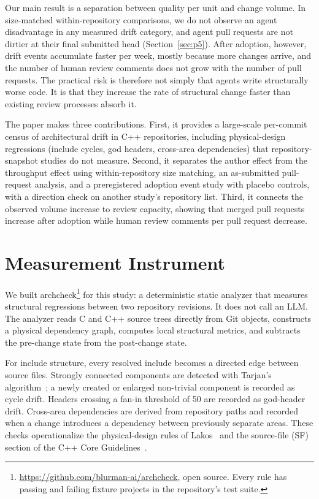 \documentclass[sigplan,11pt,nonacm=true]{acmart}
\newcommand{\tool}{archcheck}
\begin{document}
Our main result is a separation between quality per unit and change volume. In
size-matched within-repository comparisons, we do not observe an agent
disadvantage in any measured drift category, and agent pull requests are not
dirtier at their final submitted head (Section~\ref{sec:p5}). After adoption, however, drift events accumulate
faster per week, mostly because more changes arrive, and the number of human review
comments does not grow with the number of pull requests. The practical risk is therefore not simply that agents write
structurally worse code. It is that they increase the rate of structural
change faster than existing review processes absorb it.

The paper makes three contributions. First, it provides a large-scale
per-commit census of architectural drift in C++ repositories, including
physical-design regressions (include cycles, god headers, cross-area
dependencies) that repository-snapshot studies do not measure. Second, it
separates the author effect from the throughput effect using within-repository
size matching, an as-submitted pull-request analysis, and a preregistered
adoption event study with placebo controls, with a direction check on another
study's repository list. Third, it connects the
observed volume increase to review capacity, showing that merged pull requests
increase after adoption while human review comments per pull request decrease.

\section{Measurement Instrument}
\label{sec:instrument}

We built \tool{}\footnote{\url{https://github.com/blurman-ai/archcheck}, open
source. Every rule has passing and failing fixture projects in the repository's
test suite.} for this study: a deterministic static analyzer that measures
structural regressions between two repository revisions. It does not call an
LLM. The analyzer reads C and C++ source trees directly from Git objects,
constructs a physical dependency graph, computes local structural metrics, and
subtracts the pre-change state from the post-change state.

For include structure, every resolved include becomes a directed edge between
source files. Strongly connected components are detected with Tarjan's
algorithm~\cite{tarjan1972}; a newly created or enlarged non-trivial component
is recorded as cycle drift. Headers crossing a fan-in threshold of 50 are
recorded as god-header drift. Cross-area dependencies are derived from
repository paths and recorded when a change introduces a dependency between
previously separate areas. These checks operationalize the physical-design
rules of Lakos~\cite{lakos1996} and the source-file (SF) section of the C++
Core Guidelines~\cite{coreguidelines}.
\end{document}
